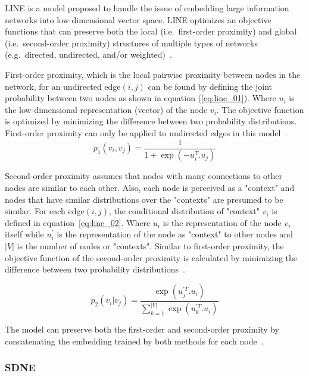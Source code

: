 \ac{LINE} is a model proposed to handle the issue of embedding large information networks into low dimensional vector space.
\ac{LINE} optimizes an objective functions that can preserve both the local (i.e.~first-order proximity) and global (i.e.~second-order proximity) structures of multiple types of networks (e.g.~directed, undirected, and/or weighted)~\cite{tang_line:_2015}.

First-order proximity, which is the local pairwise proximity between nodes in the network, for an undirected edge$(i,j)$ can be found by defining the joint probability between two nodes as shown in equation (\ref{eq:line_01}).
Where $u_{i}$ is the low-dimensional representation (vector) of the node $v_{i}$.
The objective function is optimized by minimizing the difference between two probability distributions.
First-order proximity can only be applied to undirected edges in this model~\cite{tang_line:_2015}.
\begin{equation}
    \label{eq:line_01}
    p_{1}(v_{i}, v_{j}) = \frac{1}{1+ \exp{(-u_{i}^T .u_{j})}}
\end{equation}

Second-order proximity assumes that nodes with many connections to other nodes are similar to each other.
Also, each node is perceived as a "context" and nodes that have similar distributions over the "contexts" are presumed to be similar.
For each edge$(i,j)$, the conditional distribution of "context" $v_{i}$ is defined in equation~\ref{eq:line_02}.
Where $u_{i}$ is the representation of the node $v_{i}$ itself while $u_{i}^{'}$ is the representation of the node as "context" to other nodes and $|V|$ is the number of nodes or "contexts".
Similar to first-order proximity, the objective function of the second-order proximity is calculated by minimizing the difference between two probability distributions~\cite{tang_line:_2015}.

\begin{equation}
    \label{eq:line_02}
    p_{2}(v_{i}| v_{j}) = \frac{\exp(u_{j}^{'T} .u_{i})}{\sum_{k=1}^{|V|} \exp{(u_{k}^{'T} .u_{i})}}
\end{equation}

The model can preserve both the first-order and second-order proximity by concatenating the embedding trained by both methods for each node~\cite{tang_line:_2015}.

\subsubsection{SDNE}\label{subsection:SDNE}

